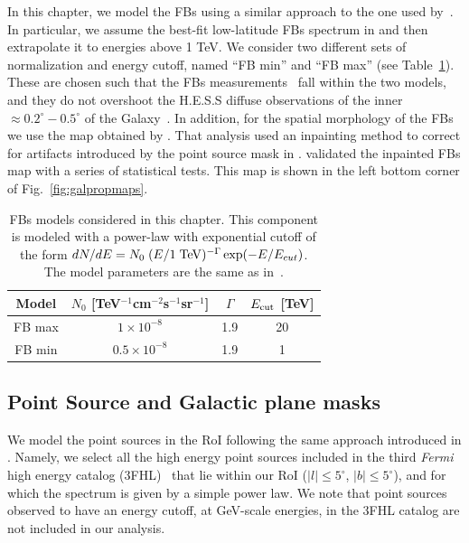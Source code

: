 \documentclass[doublespace,nopageskip]{VTthesis}
\begin{document}
In this chapter, we model the FBs using a similar approach to the one used by~\cite{2021PhRvD.103b3011R}. In particular, we assume the best-fit low-latitude FBs spectrum in \cite{2017ApJ...840...43A} and then extrapolate it to energies above 1 TeV. We consider two different sets of normalization and energy cutoff, named ``FB min'' and ``FB max'' (see Table~\ref{tab:FBmodels}). These are chosen such that the FBs measurements~\citep{2017ApJ...840...43A} fall within the two models, and they do not overshoot the H.E.S.S diffuse observations of the inner $\approx 0.2^\circ - 0.5^\circ$ of the Galaxy~\citep{2016Natur.531..476H}. In addition, for the spatial morphology of the FBs we use the map obtained by \citet{2019JCAP...09..042M}. That analysis used an inpainting method to correct for artifacts introduced by the point source mask in \cite{2017ApJ...840...43A}. \cite{2019JCAP...09..042M} validated the inpainted FBs map with a series of statistical tests. This map is shown in the left bottom corner of Fig.~\ref{fig:galpropmaps}.

\begin{table}[htb]
\begin{center}
\caption{\label{tab:FBmodels}FBs models considered in this chapter. This component is modeled with a power-law with exponential cutoff of the form $dN/dE=N_0\; (E/{\rm 1\; TeV})^{-\Gamma}\exp(-E/{E_{cut}})$. The model parameters are the same as in~\citet{2021PhRvD.103b3011R}. 
}
\begin{tabular}{cccc}
\toprule
Model & $N_0$ [TeV$^{-1}$cm$^{-2}$s$^{-1}$sr$^{-1}$] & $\Gamma$ & $E_{\rm cut}$ [TeV]\\
\midrule
FB max & $1\times10^{-8}$ & 1.9 & 20\\
FB min & $0.5\times10^{-8}$ & 1.9 & 1\\
\bottomrule
\end{tabular}
\end{center}
\end{table}

\subsection{Point Source and Galactic plane masks}
\label{subsec:pointsources}

We model the point sources in the RoI following the same approach introduced in \cite{2021PhRvD.103b3011R}. Namely, we select all the high energy point sources included in the third {\it Fermi} high energy catalog (3FHL)~\citep{2017ApJS..232...18A} that lie within our RoI ($\lvert l \rvert \leq 5^\circ$, $\lvert b \rvert \leq 5^\circ$), and for which the spectrum is given by a simple power law. We note that point sources observed to have an energy cutoff, at GeV-scale energies, in the 3FHL catalog are not included in our analysis.
\end{document}
